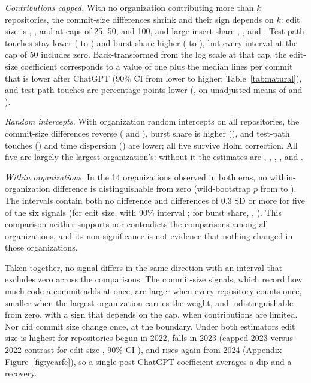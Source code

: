 \documentclass[acmsmall,screen,review,anonymous]{acmart}
\begin{document}
\textit{Contributions capped.} With no organization contributing more than $k$ repositories, the commit-size differences shrink and their sign depends on $k$: edit size is , , and  at caps of 25, 50, and 100, and large-insert share , , and . Test-path touches stay lower ( to ) and burst share higher ( to ), but every interval at the cap of 50 includes zero. Back-transformed from the log scale at that cap, the edit-size coefficient corresponds to a value of one plus the median lines per commit that is  lower after ChatGPT (90\% CI from  lower to  higher; Table~\ref{tab:natural}), and test-path touches are  percentage points lower (, on unadjusted means of  and ).

\textit{Random intercepts.} With organization random intercepts on all repositories, the commit-size differences reverse ( and ), burst share is higher (), and test-path touches () and time dispersion () are lower; all five survive Holm correction. All five are largely the largest organization's: without it the estimates are , , , , and .

\textit{Within organizations.} In the 14 organizations observed in both eras, no within-organization difference is distinguishable from zero (wild-bootstrap $p$ from  to ). The intervals contain both no difference and differences of 0.3 SD or more for five of the six signals (for edit size,  with 90\% interval ; for burst share, , ). This comparison neither supports nor contradicts the comparisons among all organizations, and its non-significance is not evidence that nothing changed in those organizations.

Taken together, no signal differs in the same direction with an interval that excludes zero across the comparisons. The commit-size signals, which record how much code a commit adds at once, are larger when every repository counts once, smaller when the largest organization carries the weight, and indistinguishable from zero, with a sign that depends on the cap, when contributions are limited. Nor did commit size change once, at the boundary. Under both estimators edit size is highest for repositories begun in 2022, falls in 2023 (capped 2023-versus-2022 contrast for edit size , 90\% CI ), and rises again from 2024 (Appendix Figure~\ref{fig:yearfe}), so a single post-ChatGPT coefficient averages a dip and a recovery.
\end{document}
